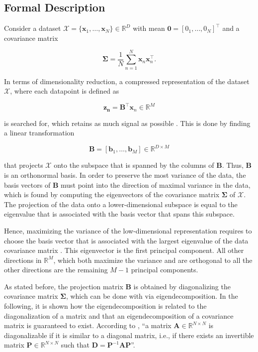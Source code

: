 \documentclass[../../../main.tex]{subfiles}
\begin{document}
\subsection{Formal Description}

Consider a dataset $\mathcal{X} = \{\bm{x}_1, \dots, \bm{x}_N\} \in \mathbb{R}^D$ with mean $\bm{0} = [0_1, \dots, 0_N]^\top$ and a covariance matrix

\begin{equation*}
    \bm{\Sigma} =\frac{1}{N}\sum_{n=1}^N\bm{x}_n\bm{x}_n^\top.
\end{equation*}

In terms of dimensionality reduction, a compressed representation of the dataset $\mathcal{X}$, where each datapoint is defined as

\begin{equation*}
    \bm{z_n} = \bm{B}^\top\bm{x}_n \in \mathbb{R}^M
\end{equation*}

is searched for, which retains as much signal as possible \cite{Hotelling1933AnalysisOA}. This is done by finding a linear transformation

\begin{equation*}
    \bm{B}=[\bm{b}_1, \dots, \bm{b}_M] \in \mathbb{R}^{D\times M}
\end{equation*}

that projects $\mathcal{X}$ onto the subspace that is spanned by the columns of $\bm{B}$. Thus, $\bm{B}$ is an orthonormal basis. In order to preserve the most variance of the data, the basis vectors of $\bm{B}$ must point into the direction of maximal variance in the data, which is found by computing the eigenvectors of the covariance matrix $\bm{\Sigma}$ of $\mathcal{X}$. The projection of the data onto a lower-dimensional subspace is equal to the eigenvalue that is associated with the basis vector that spans this subspace. 

Hence, maximizing the variance of the low-dimensional representation requires to choose the basis vector that is associated with the largest eigenvalue of the data covariance matrix \cite{dei_2020}. This eigenvector is the first principal component. All other directions in $\mathbb{R}^M$, which both maximize the variance and are orthogonal to all the other directions are the remaining $M-1$ principal components.

As stated before, the projection matrix $\bm{B}$ is obtained by diagonalizing the covariance matrix $\bm{\Sigma}$, which can be done with via eigendecomposition. In the following, it is shown how the eigendecomposition is related to the diagonalization of a matrix and that an eigendecomposition of a covariance matrix is guaranteed to exist. According to \cite[98]{dei_2020}, ``a matrix $\bm{A} \in \mathbb{R}^{N \times N}$ is diagonalizable if it is similar to a diagonal matrix, i.e., if there exists an invertible matrix $\bm{P} \in \mathbb{R}^{N \times N}$ such that $\bm{D} = \bm{P}^{-1} \bm{A} \bm{P}$''.
\end{document}
